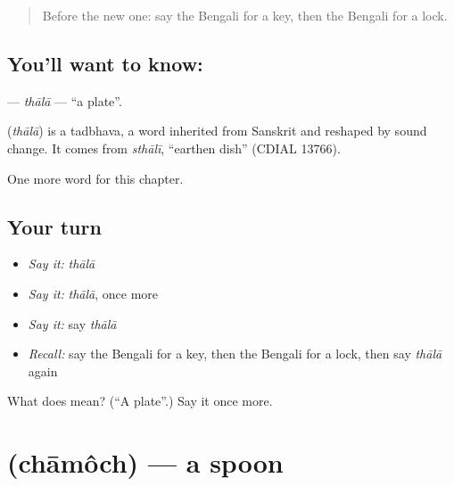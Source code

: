 \label{lesson:BN-C62-thala}



\begin{quote}
Before the new one: say the Bengali for a key, then the Bengali for a lock.
\end{quote}

\subsection*{You'll want to know: }
\textbf{} — \emph{thālā} — \textquotedblleft{}a plate\textquotedblright{}.

\begin{cousinweb}
\textbf{} (\emph{thālā}) is a tadbhava, a word inherited from Sanskrit and reshaped by sound change. It comes from \emph{sthālī}, \textquotedblleft{}earthen dish\textquotedblright{} (CDIAL 13766).
\end{cousinweb}

\begin{grammarlens}[title={What you've built}]
One more word for this chapter.
\end{grammarlens}

\subsection*{Your turn}
\begin{itemize}
\raggedright
  \item \emph{Say it:} \emph{thālā}
  \item \emph{Say it:} \emph{thālā}, once more
  \item \emph{Say it:} say \emph{thālā}
  \item \emph{Recall:} say the Bengali for a key, then the Bengali for a lock, then say \emph{thālā} again
\end{itemize}

\begin{tcolorbox}[breakable,colback=teal!4,colframe=teal!35!black,title={Before you move on}]
What does  mean? (\textquotedblleft{}A plate\textquotedblright{}.) Say it once more.
\end{tcolorbox}
\section[\texorpdfstring{\bn{চামচ} (chāmôch)}{চামচ (chāmôch)}]{ (chāmôch) — a spoon}

\label{lesson:BN-C62-chamoch}



